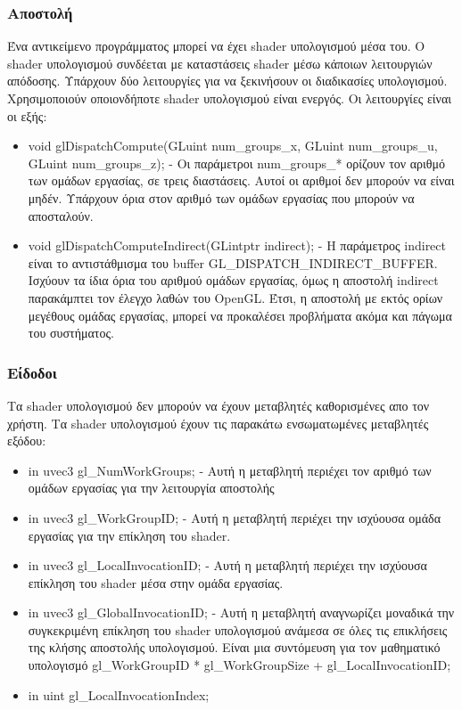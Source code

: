 \subsubsection{Αποστολή}
Ένα αντικείμενο προγράμματος μπορεί να έχει shader υπολογισμού μέσα του. Ο shader υπολογισμού συνδέεται με καταστάσεις shader μέσω κάποιων λειτουργιών απόδοσης. Υπάρχουν δύο λειτουργίες για να ξεκινήσουν οι διαδικασίες υπολογισμού. Χρησιμοποιούν οποιονδήποτε shader υπολογισμού είναι ενεργός. Οι λειτουργίες είναι οι εξής:
\begin{itemize}
\item void glDispatchCompute(GLuint num\_groups\_x, GLuint num\_groups\_u, GLuint num\_groups\_z); - Οι παράμετροι num\_groups\_* ορίζουν τον αριθμό των ομάδων εργασίας, σε τρεις διαστάσεις. Αυτοί οι αριθμοί δεν μπορούν να είναι μηδέν. Υπάρχουν όρια στον αριθμό των ομάδων εργασίας που μπορούν να αποσταλούν.
\item void glDispatchComputeIndirect(GLintptr indirect); - H παράμετρος indirect είναι το αντιστάθμισμα του buffer GL\_DISPATCH\_INDIRECT\_BUFFER. Ισχύουν τα ίδια όρια του αριθμού ομάδων εργασίας, όμως η αποστολή indirect παρακάμπτει τον έλεγχο λαθών του OpenGL. Έτσι, η αποστολή με εκτός ορίων μεγέθους ομάδας εργασίας, μπορεί να προκαλέσει προβλήματα ακόμα και πάγωμα του συστήματος.
\end{itemize}
\subsubsection{Είδοδοι}
Τα shader υπολογισμού  δεν μπορούν να έχουν μεταβλητές καθορισμένες απο τον χρήστη. Τα shader υπολογισμού έχουν τις παρακάτω ενσωματωμένες μεταβλητές εξόδου:
\begin{itemize}
\item in uvec3 gl\_NumWorkGroups; - Αυτή η μεταβλητή περιέχει τον αριθμό των ομάδων εργασίας για την λειτουργία αποστολής
\item in uvec3 gl\_WorkGroupID; - Αυτή η μεταβλητή περιέχει την ισχύουσα ομάδα εργασίας για την επίκληση του shader.
\item in uvec3 gl\_LocalInvocationID; - Αυτή η μεταβλητή περιέχει την ισχύουσα επίκληση του shader μέσα στην ομάδα εργασίας.
\item in uvec3 gl\_GlobalInvocationID; - Αυτή η μεταβλητή αναγνωρίζει μοναδικά την συγκεκριμένη επίκληση του shader υπολογισμού  ανάμεσα σε όλες τις επικλήσεις της κλήσης αποστολής υπολογισμού. Είναι μια συντόμευση για τον μαθηματικό υπολογισμό gl\_WorkGroupID * gl\_WorkGroupSize + gl\_LocalInvocationID;
\item in uint  gl\_LocalInvocationIndex;
\end{itemize}
